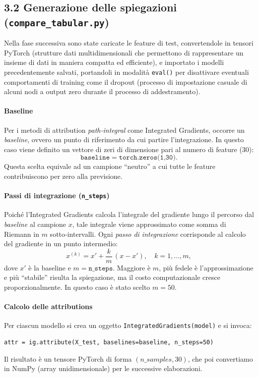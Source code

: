 \documentclass[a4paper,11pt]{article}
\begin{document}
\subsection*{3.2 Generazione delle spiegazioni (\texttt{compare\_tabular.py})}
Nella fase successiva sono state caricate le feature di test, convertendole in tensori PyTorch (strutture dati multidimensionali che permettono di rappresentare un insieme di dati in maniera compatta ed efficiente), e importato i modelli precedentemente salvati, portandoli in modalità \texttt{eval()} per disattivare eventuali comportamenti di training come il dropout (processo di impostazione casuale di alcuni nodi a output zero durante il processo di addestramento). 

\paragraph{Baseline}
Per i metodi di attribution \emph{path‐integral} come Integrated Gradients, occorre un \emph{baseline}, ovvero un punto di riferimento da cui partire l’integrazione. In questo caso viene definito un vettore di zeri di dimensione pari al numero di feature (30):
\[
  \texttt{baseline} = \texttt{torch.zeros(1,30)}.
\]
Questa scelta equivale ad un campione “neutro” a cui tutte le feature contribuiscono per zero alla previsione.

\paragraph{Passi di integrazione (\texttt{n\_steps})}
Poiché l’Integrated Gradients calcola l’integrale del gradiente lungo il percorso dal \emph{baseline} al campione \(x\), tale integrale viene approssimato come somma di Riemann in \(m\) sotto‐intervalli. 
Ogni \emph{passo di integrazione} corrisponde al calcolo del gradiente in un punto intermedio:
\[
  x^{(k)} = x' + \frac{k}{m}\,(x - x'), 
  \quad k=1,\dots,m,
\]
dove \(x'\) è la baseline e \(m=\texttt{n\_steps}\). 
Maggiore è \(m\), più fedele è l’approssimazione e più “stabile” risulta la spiegazione, ma il costo computazionale cresce proporzionalmente. 
In questo caso è stato scelto \(m=50\).

\paragraph{Calcolo delle attributions}
Per ciascun modello si crea un oggetto \texttt{IntegratedGradients(model)} e si invoca:
\begin{verbatim}
attr = ig.attribute(X_test, baselines=baseline, n_steps=50)
\end{verbatim}
Il risultato è un tensore PyTorch di forma \((n\_samples,30)\), che poi convertiamo in NumPy (array unidimensionale) per le successive elaborazioni.
\end{document}
